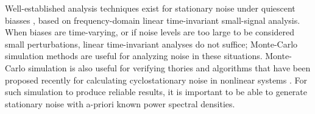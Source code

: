 \documentclass[9pt,times]{article}
\begin{document}
Well-established analysis techniques exist for stationary noise
under quiescent biasses \cite{references}, based on frequency-domain linear
time-invariant small-signal analysis. When biases are time-varying, or if
noise levels are too large to be considered small perturbations, linear
time-invariant analyses do not suffice; Monte-Carlo simulation methods
\cite{rubinstein} are useful for analyzing noise in these situations.
Monte-Carlo simulation is also useful for verifying thories and algorithms
that have been proposed recently for calculating cyclostationary noise in
nonlinear systems \cite{newwork}. For such simulation to produce reliable
results, it is important to be able to generate stationary noise with a-priori 
known power spectral densities.

\end{document}
